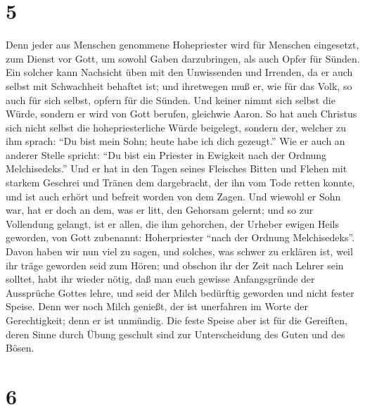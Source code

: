 \hypertarget{section-4}{%
\section{5}\label{section-4}}

 Denn jeder aus Menschen genommene Hohepriester wird für
Menschen eingesetzt, zum Dienst vor Gott, um sowohl Gaben darzubringen,
als auch Opfer für Sünden.  Ein solcher kann Nachsicht
üben mit den Unwissenden und Irrenden, da er auch selbst mit Schwachheit
behaftet ist;  und ihretwegen muß er, wie für das Volk, so
auch für sich selbst, opfern für die Sünden.  Und keiner
nimmt sich selbst die Würde, sondern er wird von Gott berufen, gleichwie
Aaron.  So hat auch Christus sich nicht selbst die
hohepriesterliche Würde beigelegt, sondern der, welcher zu ihm sprach:
``Du bist mein Sohn; heute habe ich dich gezeugt.''  Wie
er auch an anderer Stelle spricht: ``Du bist ein Priester in Ewigkeit
nach der Ordnung Melchisedeks.''  Und er hat in den Tagen
seines Fleisches Bitten und Flehen mit starkem Geschrei und Tränen dem
dargebracht, der ihn vom Tode retten konnte, und ist auch erhört und
befreit worden von dem Zagen.  Und wiewohl er Sohn war,
hat er doch an dem, was er litt, den Gehorsam gelernt; 
und so zur Vollendung gelangt, ist er allen, die ihm gehorchen, der
Urheber ewigen Heils geworden,  von Gott zubenannt:
Hoherpriester ``nach der Ordnung Melchisedeks''.  Davon
haben wir nun viel zu sagen, und solches, was schwer zu erklären ist,
weil ihr träge geworden seid zum Hören;  und obschon ihr
der Zeit nach Lehrer sein solltet, habt ihr wieder nötig, daß man euch
gewisse Anfangsgründe der Aussprüche Gottes lehre, und seid der Milch
bedürftig geworden und nicht fester Speise.  Denn wer
noch Milch genießt, der ist unerfahren im Worte der Gerechtigkeit; denn
er ist unmündig.  Die feste Speise aber ist für die
Gereiften, deren Sinne durch Übung geschult sind zur Unterscheidung des
Guten und des Bösen.

\hypertarget{section-5}{%
\section{6}\label{section-5}}

